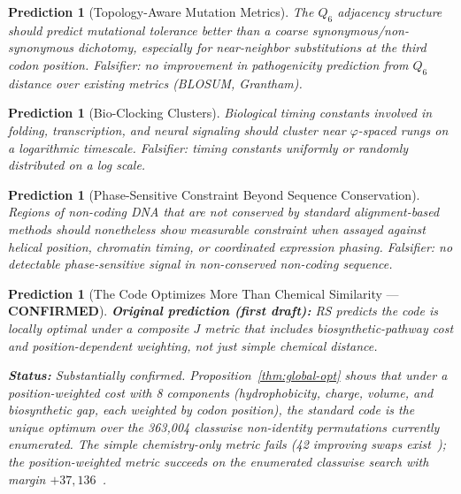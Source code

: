 \documentclass[11pt,a4paper]{article}
\newtheorem{prediction}[theorem]{Prediction}
\newcommand{\Jcost}{J}
\newcommand{\ph}{\varphi}
\newcommand{\Qsix}{\ensuremath{Q_6}}
\begin{document}
\begin{prediction}[Topology-Aware Mutation Metrics]
\label{pred:q6}
The \Qsix{} adjacency structure should predict mutational tolerance better than a coarse synonymous/non-synonymous dichotomy, especially for near-neighbor substitutions at the third codon position. \emph{Falsifier}: no improvement in pathogenicity prediction from \Qsix{} distance over existing metrics (BLOSUM, Grantham).
\end{prediction}

\begin{prediction}[Bio-Clocking Clusters]
\label{pred:bioclock}
Biological timing constants involved in folding, transcription, and neural signaling should cluster near $\ph$-spaced rungs on a logarithmic timescale. \emph{Falsifier}: timing constants uniformly or randomly distributed on a log scale.
\end{prediction}

\begin{prediction}[Phase-Sensitive Constraint Beyond Sequence Conservation]
\label{pred:phase}
Regions of non-coding DNA that are not conserved by standard alignment-based methods should nonetheless show measurable constraint when assayed against helical position, chromatin timing, or coordinated expression phasing. \emph{Falsifier}: no detectable phase-sensitive signal in non-conserved non-coding sequence.
\end{prediction}

\begin{prediction}[The Code Optimizes More Than Chemical Similarity --- \textbf{CONFIRMED}]
\label{pred:composite}
\textbf{Original prediction (first draft):} RS predicts the code is locally optimal under a composite $\Jcost$ metric that includes biosynthetic-pathway cost and position-dependent weighting, not just simple chemical distance.

\textbf{Status:} \emph{Substantially confirmed.} Proposition~\ref{thm:global-opt} shows that under a position-weighted cost with 8 components (hydrophobicity, charge, volume, and biosynthetic gap, each weighted by codon position), the standard code is the unique optimum over the 363,004 classwise non-identity permutations currently enumerated. The simple chemistry-only metric fails (42 improving swaps exist~\cite{Washburn2026a}); the position-weighted metric succeeds on the enumerated classwise search with margin $+37{,}136$~\cite{Washburn2026b}.
\end{prediction}

\end{document}

